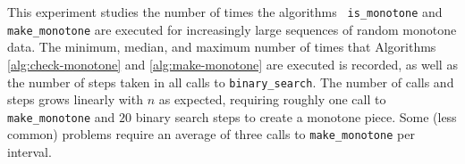 


This experiment studies the number of times the algorithms {\tt
  is\_monotone} and {\tt make\_monotone} are executed for increasingly
large sequences of random monotone data. The minimum, median, and
maximum number of times that Algorithms \ref{alg:check-monotone} and
\ref{alg:make-monotone} are executed is recorded, as well as the
number of steps taken in all calls to {\tt binary\_search}. The number
of calls and steps grows linearly with $n$ as expected, requiring
roughly one call to {\tt make\_monotone} and $20$ binary search steps
to create a monotone piece. Some (less common) problems require an
average of three calls to {\tt make\_monotone} per interval.

